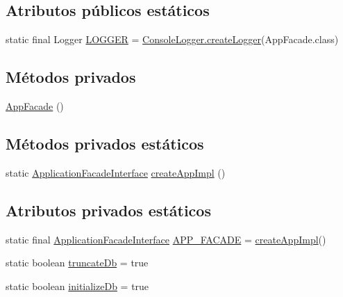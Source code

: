 \subsection*{Atributos públicos estáticos}
\begin{DoxyCompactItemize}
\item 
static final Logger \mbox{\hyperlink{classcom_1_1ruralhousejsf_1_1business_logic_1_1_app_facade_a05d4beab693581eccd0ba740dc222f37}{L\+O\+G\+G\+ER}} = \mbox{\hyperlink{classcom_1_1ruralhousejsf_1_1logger_1_1_console_logger_a520321643663e37d95761134a35505cd}{Console\+Logger.\+create\+Logger}}(App\+Facade.\+class)
\end{DoxyCompactItemize}
\subsection*{Métodos privados}
\begin{DoxyCompactItemize}
\item 
\mbox{\hyperlink{classcom_1_1ruralhousejsf_1_1business_logic_1_1_app_facade_a06c4cf71ecdbda8e7abccdd21d84d549}{App\+Facade}} ()
\end{DoxyCompactItemize}
\subsection*{Métodos privados estáticos}
\begin{DoxyCompactItemize}
\item 
static \mbox{\hyperlink{interfacecom_1_1ruralhousejsf_1_1business_logic_1_1_application_facade_interface}{Application\+Facade\+Interface}} \mbox{\hyperlink{classcom_1_1ruralhousejsf_1_1business_logic_1_1_app_facade_a8f4d396c7d2ce6ba084554d68385fc34}{create\+App\+Impl}} ()
\end{DoxyCompactItemize}
\subsection*{Atributos privados estáticos}
\begin{DoxyCompactItemize}
\item 
static final \mbox{\hyperlink{interfacecom_1_1ruralhousejsf_1_1business_logic_1_1_application_facade_interface}{Application\+Facade\+Interface}} \mbox{\hyperlink{classcom_1_1ruralhousejsf_1_1business_logic_1_1_app_facade_a112b5fb14ea720f893a3c52a26a775c9}{A\+P\+P\+\_\+\+F\+A\+C\+A\+DE}} = \mbox{\hyperlink{classcom_1_1ruralhousejsf_1_1business_logic_1_1_app_facade_a8f4d396c7d2ce6ba084554d68385fc34}{create\+App\+Impl}}()
\item 
static boolean \mbox{\hyperlink{classcom_1_1ruralhousejsf_1_1business_logic_1_1_app_facade_ac9cbe77035be5cc1f9bf258c57ca6564}{truncate\+Db}} = true
\item 
static boolean \mbox{\hyperlink{classcom_1_1ruralhousejsf_1_1business_logic_1_1_app_facade_a08e1f188faabf8bef71610c49bdd5d84}{initialize\+Db}} = true
\end{DoxyCompactItemize}



